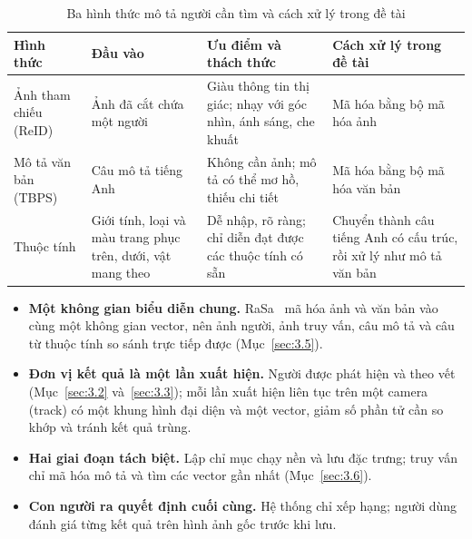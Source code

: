 \begin{table}[H]
\centering
\caption{Ba hình thức mô tả người cần tìm và cách xử lý trong đề tài}
\label{tab:query-modes}
\begin{tabularx}{\textwidth}{|>{\raggedright\arraybackslash}p{2.6cm}|L|L|L|}
\hline
\textbf{Hình thức} & \textbf{Đầu vào} & \textbf{Ưu điểm và thách thức} & \textbf{Cách xử lý trong đề tài} \\
\hline
Ảnh tham chiếu (ReID) & Ảnh đã cắt chứa một người & Giàu thông tin thị giác; nhạy với góc nhìn, ánh sáng, che khuất & Mã hóa bằng bộ mã hóa ảnh \\
\hline
Mô tả văn bản (TBPS) & Câu mô tả tiếng Anh & Không cần ảnh; mô tả có thể mơ hồ, thiếu chi tiết & Mã hóa bằng bộ mã hóa văn bản \\
\hline
Thuộc tính & Giới tính, loại và màu trang phục trên, dưới, vật mang theo & Dễ nhập, rõ ràng; chỉ diễn đạt được các thuộc tính có sẵn & Chuyển thành câu tiếng Anh có cấu trúc, rồi xử lý như mô tả văn bản \\
\hline
\end{tabularx}
\end{table}

\begin{itemize}
    \item \textbf{Một không gian biểu diễn chung.} RaSa~\cite{bai2023rasa} mã hóa ảnh và văn bản vào cùng một không gian vector, nên ảnh người, ảnh truy vấn, câu mô tả và câu từ thuộc tính so sánh trực tiếp được (Mục~\ref{sec:3.5}).
    \item \textbf{Đơn vị kết quả là một lần xuất hiện.} Người được phát hiện và theo vết (Mục~\ref{sec:3.2} và~\ref{sec:3.3}); mỗi lần xuất hiện liên tục trên một camera (track) có một khung hình đại diện và một vector, giảm số phần tử cần so khớp và tránh kết quả trùng.
    \item \textbf{Hai giai đoạn tách biệt.} Lập chỉ mục chạy nền và lưu đặc trưng; truy vấn chỉ mã hóa mô tả và tìm các vector gần nhất (Mục~\ref{sec:3.6}).
    \item \textbf{Con người ra quyết định cuối cùng.} Hệ thống chỉ xếp hạng; người dùng đánh giá từng kết quả trên hình ảnh gốc trước khi lưu.
\end{itemize}
